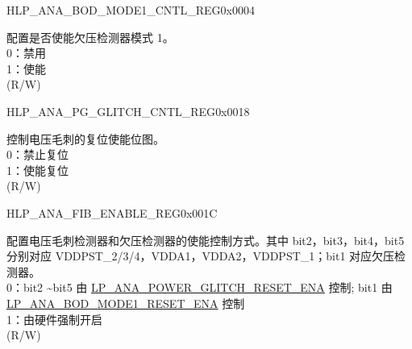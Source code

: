 \begin{register}{H}{LP\_ANA\_BOD\_MODE1\_CNTL\_REG}{0x0004}
\label{regdesc:LPANABODMODE1CNTLREG}
%
%
\regnewline%
\begin{regdesc}\begin{reglist}
\label{fielddesc:LPANABODMODE1RESETENA}\item [LP\_ANA\_BOD\_MODE1\_RESET\_ENA]  配置是否使能欠压检测器模式 1。\\
0：禁用\\
1：使能\\
(R/W)
\end{reglist}\end{regdesc}
\end{register}


\begin{register}{H}{LP\_ANA\_PG\_GLITCH\_CNTL\_REG}{0x0018}\label{regdesc:LPANAPGGLITCHCNTLREG}
%
%
%
\regnewline%
\begin{regdesc}\begin{reglist}
\label{fielddesc:LPANAPOWERGLITCHRESETENA}\item [LP\_ANA\_POWER\_GLITCH\_RESET\_ENA] 控制电压毛刺的复位使能位图。\\
0：禁止复位 \\
1：使能复位 \\
(R/W)
\end{reglist}\end{regdesc}
\end{register}

\begin{register}{H}{LP\_ANA\_FIB\_ENABLE\_REG}{0x001C}\label{regdesc:LPANAFIBENABLEREG}
%
\regnewline%
\begin{regdesc}\begin{reglist}
\label{fielddesc:LPANAANAFIBENA}\item [LP\_ANA\_ANA\_FIB\_ENA] 配置电压毛刺检测器和欠压检测器的使能控制方式。其中 bit2，bit3，bit4，bit5 分别对应 VDDPST\_2/3/4，VDDA1，VDDA2，VDDPST\_1；bit1 对应欠压检测器。\\
0：bit2 \textasciitilde bit5 由 \hyperref[fielddesc:LPANAPOWERGLITCHRESETENA]{LP\_\-ANA\_\-POWER\_\-GLITCH\_\-RESET\_\-ENA} 控制; bit1 由 \hyperref[fielddesc:LPANABODMODE1RESETENA]{LP\_\-ANA\_BOD\_\-MODE1\_\-RESET\_\-ENA} 控制\\
1：由硬件强制开启\\
(R/W)
\end{reglist}\end{regdesc}
\end{register}

